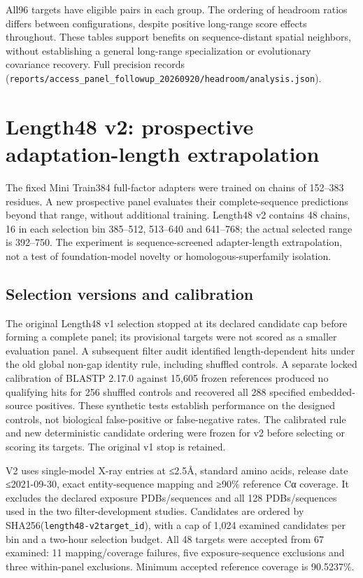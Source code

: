 All96 targets have eligible pairs in each group. The ordering of headroom
ratios differs between configurations, despite positive long-range score
effects throughout. These tables support benefits on sequence-distant spatial
neighbors, without establishing a general long-range specialization or
evolutionary covariance recovery. Full precision records (\nolinkurl{reports/access_panel_followup_20260920/headroom/analysis.json}).

\section{Length48 v2: prospective adaptation-length extrapolation}\label{length48-v2-prospective-adaptation-length-extrapolation}

The fixed Mini Train384 full-factor adapters were trained on chains of 152--383
residues. A new prospective panel evaluates their complete-sequence predictions
beyond that range, without additional training. Length48 v2 contains 48 chains,
16 in each selection bin 385--512, 513--640 and 641--768; the actual selected range
is 392--750. The experiment is sequence-screened adapter-length extrapolation,
not a test of foundation-model novelty or homologous-superfamily isolation.

\subsection{Selection versions and calibration}\label{selection-versions-and-calibration}

The original Length48 v1 selection stopped at its declared candidate cap before
forming a complete panel; its provisional targets were not scored as a smaller
evaluation panel. A subsequent filter audit identified length-dependent hits
under the old global non-gap identity rule, including shuffled controls. A
separate locked calibration of BLASTP 2.17.0 against 15,605 frozen references
produced no qualifying hits for 256 shuffled controls and recovered all 288
specified embedded-source positives. These synthetic tests establish performance
on the designed controls, not biological false-positive or false-negative rates.
The calibrated rule and new deterministic candidate ordering were frozen for v2
before selecting or scoring its targets. The original v1 stop is retained.

V2 uses single-model X-ray entries at ≤2.5Å, standard amino acids, release date
≤2021-09-30, exact entity-sequence mapping and ≥90\% reference Cα coverage. It
excludes the declared exposure PDBs/sequences and all 128 PDBs/sequences used in
the two filter-development studies. Candidates are ordered by
SHA256(\texttt{length48-v2\textbar{}target\_id}), with a cap of 1,024 examined candidates per bin
and a two-hour selection budget. All 48 targets were accepted from 67 examined:
11 mapping/coverage failures, five exposure-sequence exclusions and three
within-panel exclusions. Minimum accepted reference coverage is 90.5237\%.

